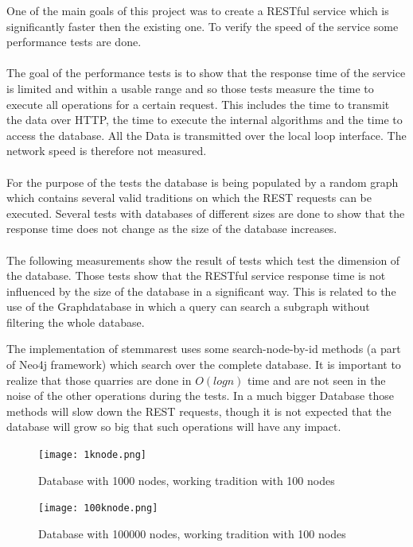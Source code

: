 \documentclass[11pt,fleqn,openany]{book} %
\begin{document}
One of the main goals of this project was to create a RESTful service which is significantly faster then the existing one. To verify the speed of the service some performance tests are done. 
\\ \quad \\
The goal of the performance tests is to show that the response time of the service is limited and within a usable range and so those tests measure the time to execute all operations for a certain request. This includes the time to transmit the data over HTTP, the time to execute the internal algorithms and the time to access the database. All the Data is transmitted over the local loop interface. The network speed is therefore not measured. 
\\ \quad \\
For the purpose of the tests the database is being populated by a random graph which contains several valid traditions on which the REST requests can be executed. Several tests with databases of different sizes are done to show that the response time does not change as the size of the database increases.
\\ \quad \\
The following measurements show the result of tests which test the dimension of the database. Those tests show that the RESTful service response time is not influenced by the size of the database in a significant way. This is related to the use of the Graphdatabase in which a query can search a subgraph without filtering the whole database. 
\begin{remark}
The implementation of stemmarest uses some search-node-by-id methods (a part of Neo4j framework) which search over the complete database. It is important to realize that those quarries are done in $O(log n)$ time and are not seen in the noise of the other operations during the tests. In a much bigger Database those methods will slow down the REST requests, though it is not expected that the database will grow so big that such operations will have any impact.
\end{remark} 

\begin{figure}[h!]
  \caption{Database with 1000 nodes,  working tradition with 100 nodes }
  \centering
    \texttt{[image: 1knode.png]}
\end{figure}

\begin{figure}[h!]
  \caption{Database with 100000 nodes,  working tradition with 100 nodes }
  \centering
    \texttt{[image: 100knode.png]}
\end{figure}
\end{document}

